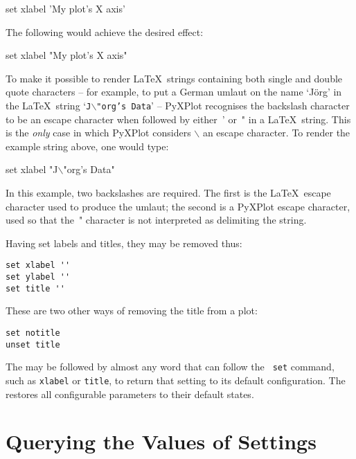 \begin{dontdo}
set xlabel 'My plot's X axis'
\end{dontdo}

\noindent The following would achieve the desired effect:

\begin{dodo}
set xlabel "My plot's X axis"
\end{dodo}

To make it possible to render \LaTeX\ strings containing both single and double
quote characters -- for example, to put a German umlaut on the name `J\"org' in
the \LaTeX\ string `{\tt J$\backslash$"org's Data}' -- PyXPlot recognises the
backslash character to be an escape character when followed by either~' or~" in
a \LaTeX\ string. This is the \textit{only} case in which PyXPlot considers
$\backslash$ an escape character. To render the example string above, one would
type:

\begin{dodo}
set xlabel "J$\backslash$"org's Data"
\end{dodo}

\noindent In this example, two backslashes are required.  The first is the
\LaTeX\ escape character used to produce the umlaut; the second is a PyXPlot
escape character, used so that the~" character is not interpreted as
delimiting the string. 

Having set labels and titles, they may be removed thus:

\begin{verbatim}
set xlabel ''
set ylabel ''
set title ''
\end{verbatim}

\noindent These are two other ways of removing the title from a plot:

\begin{verbatim}
set notitle
unset title
\end{verbatim}

The  may be followed by almost any word that can follow the {\tt
set} command, such as {\tt xlabel} or {\tt title}, to return that setting to
its default configuration. The  restores all configurable
parameters to their default states.

\section{Querying the Values of Settings}

